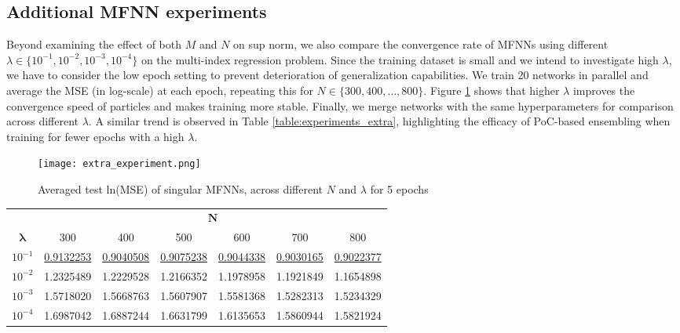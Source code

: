 \clearpage

\subsection{Additional MFNN experiments} \label{subsec:additional_experiments}
Beyond examining the effect of both $M$ and $N$ on sup norm, we also compare the convergence rate of MFNNs using different $\lambda \in \{10^{-1}, 10^{-2}, 10^{-3}, 10^{-4} \}$ on the multi-index regression problem. Since the training dataset is small and we intend to investigate high $\lambda$, we have to consider the low epoch setting to prevent deterioration of generalization capabilities. We train 20 networks in parallel and average the MSE (in log-scale) at each epoch, repeating this for $N\in \{300, 400, \dots, 800\}$. Figure \ref{fig:experiments_extra} shows that higher $\lambda$ improves the convergence speed of particles and makes training more stable. Finally, we merge networks with the same hyperparameters for comparison across different $\lambda$. A similar trend is observed in Table \ref{table:experiments_extra}, highlighting the efficacy of PoC-based ensembling when training for fewer epochs with a high $\lambda$.

\begin{figure}[H]
\vskip 0.2in
\begin{center}
\centerline{\texttt{[image: extra\_experiment.png]}}
\caption{Averaged test ln(MSE) of singular MFNNs, across different $N$ and $\lambda$ for 5 epochs}  
\label{fig:experiments_extra}
\end{center}
\end{figure}

\begin{table*}[th]
    \centering
    \caption{MSE comparison between merging $M=20$ networks across different $N$ and $\lambda$ after 5 epochs.}
    \label{table:experiments_extra}
    \begin{footnotesize}
    \begin{tabular}{ccccccc} 
    \toprule
    & \multicolumn{6}{c}{$\boldsymbol{N}$} \\
    $\boldsymbol{\lambda}$ & 300 & 400 & 500 & 600 & 700 & 800\\
    \midrule
    $10^{-1}$ & \underline{0.9132253} & \underline{0.9040508}& \underline{0.9075238}& \underline{0.9044338}& \underline{0.9030165}&  \underline{0.9022377}\\
    $10^{-2}$ & 1.2325489& 1.2229528& 1.2166352& 1.1978958 & 1.1921849& 1.1654898\\
    $10^{-3}$ & 1.5718020& 1.5668763& 1.5607907& 1.5581368& 1.5282313& 1.5234329\\
    $10^{-4}$ & 1.6987042& 1.6887244& 1.6631799& 1.6135653& 1.5860944& 1.5821924\\
    \bottomrule
    \end{tabular}
    \end{footnotesize}
\end{table*}


